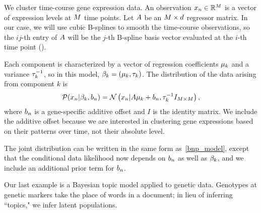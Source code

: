 

\begin{ex}

We cluster time-course gene expression data.
An observation $x_n\in\mathbb{R}^M$ is a vector of
expression levels at $M$
time points.
Let $A$ be an $M \times d$ regressor matrix.
In our case, we will use cubic B-splines to smooth the time-course observations,
so the $ij$-th entry of $A$
will be the $j$-th B-spline basis vector evaluated at the
$i$-th time point ().

Each component is characterized by a vector of regression coefficients
$\mu_k$ and a variance $\tau^{-1}_k$, so
in this model, $\beta_k = (\mu_k, \tau_k)$.
The distribution of the data arising from component $k$ is
\begin{align*}
\mathcal{P}(x_n | \beta_k, b_n) =
\mathcal{N}\left(x_n | A\mu_k + b_n,
\tau_k^{-1}I_{M \times M}\right),
\end{align*}
%
where $b_{n}$ is a gene-specific additive offset and $I$ is the identity matrix.
We include the additive offset because we
are interested in clustering gene expressions based on their patterns over time,
not their absolute level.

The joint distribution can be written in the same form as~\eqref{bnp_model},
except that the conditional data likelihood now depends on $b_n$ as well as $\beta_k$,
and we include an additional prior term for $b_n$.
%
\end{ex}


Our last example is a Bayesian topic model applied to genetic data.
Genotypes at genetic markers take the place of
words in a document; in lieu of inferring ``topics," we infer latent populations.

